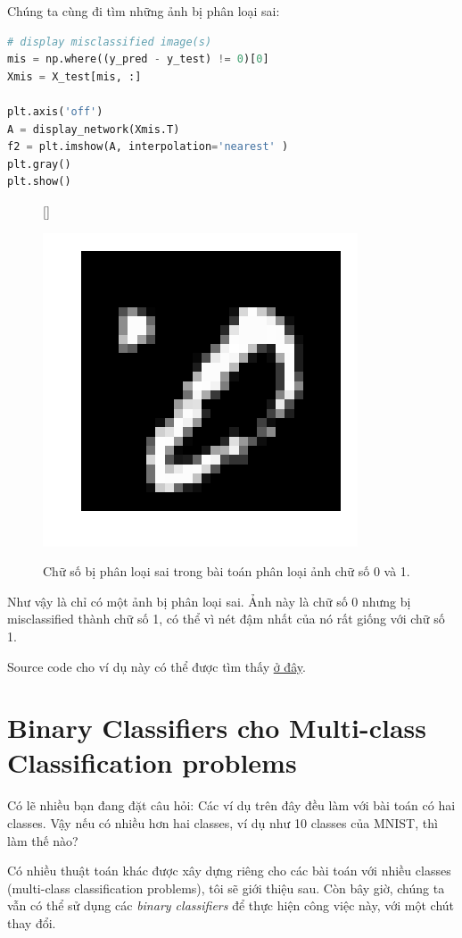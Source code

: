 Chúng ta cùng đi tìm những ảnh bị phân loại sai: 
 
\begin{lstlisting}[language=Python]
# display misclassified image(s) 
mis = np.where((y_pred - y_test) != 0)[0] 
Xmis = X_test[mis, :] 
 
plt.axis('off') 
A = display_network(Xmis.T) 
f2 = plt.imshow(A, interpolation='nearest' ) 
plt.gray() 
plt.show() 
\end{lstlisting}
 
\begin{figure}[t]
    [\FBwidth]
    {\caption{ 
    Chữ số bị phân loại sai trong bài toán phân loại ảnh chữ số 0 và 1.
    }
    \label{fig:10_3}}
    { %
    \includegraphics[width=.15\textwidth]{Chapters/05_NeuralNetworks/12_binaryclassifiers/0.png}
    }
\end{figure}

Như vậy là chỉ có một ảnh bị phân loại sai. Ảnh này là chữ số 0 nhưng bị misclassified thành chữ số 1, có thể vì nét đậm nhất của nó rất giống với chữ số 1.  
 
Source code cho ví dụ này có thể được tìm thấy \href{http://machinelearningcoban.com/assets/LogReg2/LogReg2.ipynb}{ở đây}. 
 
 
\section{Binary Classifiers cho Multi-class Classification problems }
 
Có lẽ nhiều bạn đang đặt câu hỏi: Các ví dụ trên đây đều làm với bài toán có hai classes. Vậy nếu có nhiều hơn hai classes, ví dụ như 10 classes của MNIST, thì làm thế nào? 
 
Có nhiều thuật toán khác được xây dựng riêng cho các bài toán với nhiều classes (multi-class classification problems), tôi sẽ giới thiệu sau. Còn bây giờ, chúng ta vẫn có thể sử dụng các \textit{binary classifiers} để thực hiện công việc này, với một chút thay đổi.  
 
